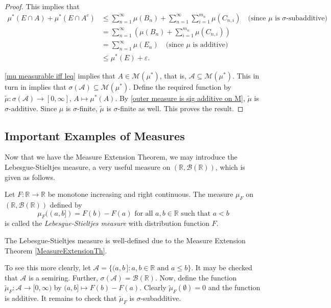 \begin{proof}
    This implies that
    \begin{align*}
        \mu^*(E\cap A) + \mu^*(E\cap A^c) &\leq \sum_{n=1}^\infty\mu(B_n) + \sum_{n=1}^\infty\sum_{i=1}^{m_n}\mu(C_{n,i}) \quad\text{(since $\mu$ is $\sigma$-subadditive)} \\
        &= \sum_{n=1}^\infty\left(\mu(B_n) + \sum_{i=1}^{m_n}\mu(C_{n,i})\right) \\
        &= \sum_{n=1}^\infty \mu(E_n) \quad\text{(since $\mu$ is additive)} \\
        &   \leq \mu^*(E) + \varepsilon.
    \end{align*}
    
    \cref{mu measurable iff leq} implies that $A\in\mathcal{M}(\mu^*)$, that is, $\mathcal{A}\subseteq\mathcal{M}(\mu^*)$. This in turn in implies that $\sigma(\mathcal{A})\subseteq\mathcal{M}(\mu^*)$. Define the required function by $\tilde\mu:\sigma(\mathcal{A})\to[0,\infty]$, $A\mapsto\mu^*(A)$. By \cref{outer measure is sig additive on M}, $\tilde\mu$ is $\sigma$-additive. Since $\mu$ is $\sigma$-finite, $\tilde\mu$ is $\sigma$-finite as well. This proves the result.
\end{proof}

\subsection{Important Examples of Measures}

Now that we have the Measure Extension Theorem, we may introduce the Lebesgue-Stieltjes measure, a very useful measure on $(\mathbb{R},\mathcal{B}(\mathbb{R}))$, which is given as follows.

\begin{definition}
\label{defLebStielMeasure}
    Let $F:\mathbb{R}\to\mathbb{R}$ be monotone increasing and right continuous. The measure $\mu_F$ on $(\mathbb{R},\mathcal{B}(\mathbb{R}))$ defined by 
    $$\mu_F((a,b])= F(b)-F(a)\text{ for all $a,b\in\mathbb{R}$ such that $a<b$}$$
    is called the \textit{Lebesgue-Stieltjes measure} with distribution function $F$.
\end{definition}

The Lebesgue-Stieltjes measure is well-defined due to the Measure Extension Theorem \cref{MeasureExtensionTh}.

\vspace{1mm}
To see this more clearly, let $\mathcal{A}=\{(a,b\,]:a,b\in\mathbb{R}\text{ and }a\leq b\}$. It may be checked that $\mathcal{A}$ is a semiring. Further, $\sigma(\mathcal{A})=\mathcal{B}(\mathbb{R})$. Now, define the function $\tilde\mu_F:\mathcal{A}\to[0,\infty)$ by $(a,b]\mapsto F(b)-F(a)$. Clearly $\tilde\mu_F(\emptyset)=0$ and the function is additive. It remains to check that $\tilde\mu_F$ is $\sigma$-subadditive.

